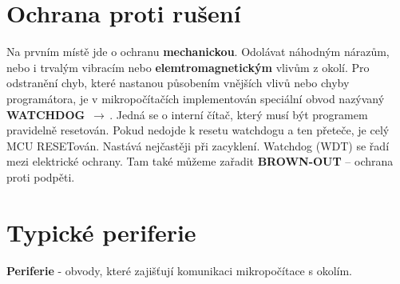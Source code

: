 \section{Ochrana proti rušení}
Na prvním místě jde o ochranu \textbf{mechanickou}. Odolávat náhodným nárazům, nebo i trvalým vibracím nebo \textbf{elemtromagnetickým} vlivům z okolí. Pro odstranění chyb, které nastanou působením vnějších vlivů nebo chyby programátora, je v mikropočítačích implementován speciální obvod nazývaný \textbf{WATCHDOG} $\,\to\,$. Jedná se o interní čítač, který musí být programem pravidelně resetován. Pokud nedojde k resetu watchdogu a ten přeteče, je celý MCU RESETován. Nastává nejčastěji při zacyklení. Watchdog (WDT) se řadí mezi elektrické ochrany. Tam také můžeme zařadit \textbf{BROWN-OUT} -- ochrana proti podpěti.

\section{Typické periferie}
\textbf{Periferie} - obvody, které zajišťují komunikaci mikropočítace s okolím.

